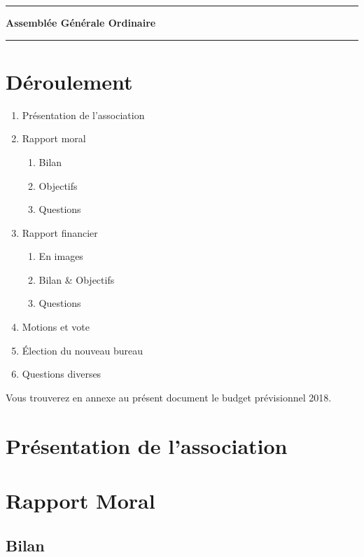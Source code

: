 \documentclass[11pt]{article}
\begin{document}
\hrule
\vspace{.6cm}
\begin{center}
\Large\bfseries Assemblée Générale Ordinaire
\end{center}
\vspace{.3cm}
\hrule

\vspace{1.5cm}

\section*{Déroulement}

\begin{enumerate}
    \item Présentation de l'association
    \item Rapport moral
        \begin{enumerate}
            \item Bilan
            \item Objectifs
            \item Questions
        \end{enumerate}
    \item Rapport financier
        \begin{enumerate}
						\item En images
            \item Bilan \& Objectifs
            \item Questions
        \end{enumerate}
    \item Motions et vote
    \item Élection du nouveau bureau
    \item Questions diverses
\end{enumerate}

Vous trouverez en annexe au présent document le budget prévisionnel 2018.

\section{Présentation de l'association}

\section{Rapport Moral}

\subsection{Bilan}
\end{document}
